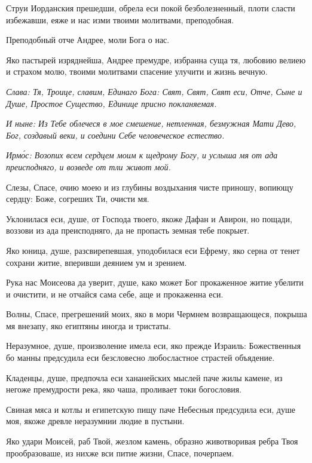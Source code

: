 
Струи Иорданския прешедши, обрела еси покой безболезненный, плоти сласти избежавши, еяже и нас изми твоими молитвами, преподобная.

Преподобный отче Андрее, моли Бога о нас.

Яко пастырей изряднейша, Андрее премудре, избранна суща тя, любовию велиею и страхом молю, твоими молитвами спасение улучити и жизнь вечную.

\itshape Слава\normalfont{}: Тя, Троице, славим, Единаго Бога: Свят, Свят, Свят еси, Отче, Сыне и Душе, Простое Существо, Единице присно покланяемая.

\itshape И ныне\normalfont{}: Из Тебе облечеся в мое смешение, нетленная, безмужная Мати Дево, Бог, создавый веки, и соедини Себе человеческое естество. 


\itshape Ирм\'{о}с\normalfont{}: Возопих всем сердцем моим к щедрому Богу, и услыша мя от ада преисподняго, и возведе от тли живот мой.

Слезы, Спасе, очию моею и из глубины воздыхания чисте приношу, вопиющу сердцу: Боже, согреших Ти, очисти мя.

Уклонилася еси, душе, от Господа твоего, якоже Дафан и Авирон, но пощади, воззови из ада преисподняго, да не пропасть земная тебе покрыет.

Яко юница, душе, разсвирепевшая, уподобилася еси Ефрему, яко серна от тенет сохрани житие, вперивши деянием ум и зрением.

Рука нас Моисеова да уверит, душе, како может Бог прокаженное житие убелити и очистити, и не отчайся сама себе, аще и прокаженна еси.

Волны, Спасе, прегрешений моих, яко в мори Чермнем возвращающеся, покрыша мя внезапу, яко египтяны иногда и тристаты.

Неразумное, душе, произволение имела еси, яко прежде Израиль: Божественныя бо манны предсудила еси безсловесно любосластное страстей объядение.

Кладенцы, душе, предпочла еси хананейских мыслей паче жилы камене, из негоже премудрости река, яко чаша, проливает токи богословия.

Свиная мяса и котлы и египетскую пищу паче Небесныя предсудила еси, душе моя, якоже древле неразумнии людие в пустыни.

Яко удари Моисей, раб Твой, жезлом камень, образно животворивая ребра Твоя прообразоваше, из нихже вси питие жизни, Спасе, почерпаем.

